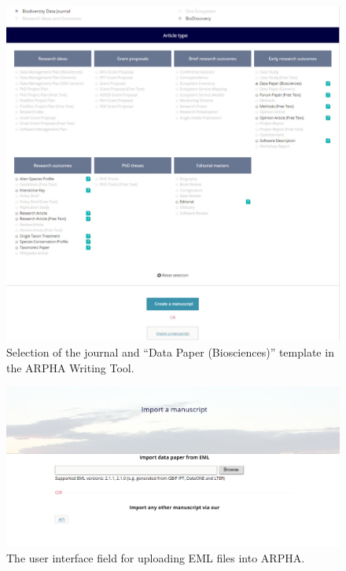 \begin{figure}
\centering
\includegraphics[width=\textwidth]{Figures/journal-selection}
\decoRule
\caption{Selection of the journal and ``Data Paper (Biosciences)'' template in the ARPHA Writing Tool.}
\label{fig:journal-selection}
\end{figure}

\begin{figure}
\centering
\includegraphics[width=\textwidth]{Figures/user-interface}
\decoRule
\caption{The user interface field for uploading EML files into ARPHA.}
\label{fig:user-interface}
\end{figure}

